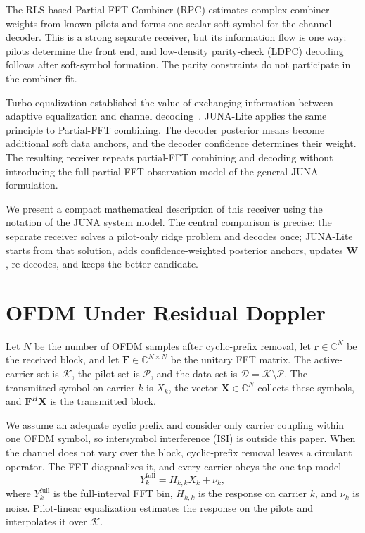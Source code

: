 \documentclass[conference]{IEEEtran}
\newcommand{\C}{\mathbb{C}}
\newcommand{\Pset}{\mathcal{P}}
\newcommand{\Dset}{\mathcal{D}}
\newcommand{\Kset}{\mathcal{K}}
\begin{document}
The RLS-based Partial-FFT Combiner (RPC) estimates complex combiner weights
from known pilots and forms one scalar soft symbol for the channel
decoder.  This is a strong separate receiver, but its information flow is one
way: pilots determine the front end, and low-density parity-check (LDPC)
decoding follows after soft-symbol formation.  The parity constraints do not
participate in the combiner fit.

Turbo equalization established the value of exchanging information between
adaptive equalization and channel decoding~\cite{laot,zheng}.  JUNA-Lite
applies the same principle to Partial-FFT combining.  The decoder posterior
means become additional soft data anchors, and the decoder confidence
determines their weight.  The resulting receiver repeats partial-FFT combining
and decoding without introducing the full partial-FFT observation model of the general
JUNA formulation.

We present a compact mathematical description of this receiver using
the notation of the JUNA system model.  The central comparison is precise:
the separate receiver solves a pilot-only ridge problem and decodes once;
JUNA-Lite starts from that solution, adds confidence-weighted posterior
anchors, updates \(\mathbf W\), re-decodes, and keeps the better candidate.

\section{OFDM Under Residual Doppler}

Let \(N\) be the number of OFDM samples after cyclic-prefix removal, let
\(\mathbf r\in\C^N\) be the received block, and let
\(\mathbf F\in\C^{N\times N}\) be the unitary FFT matrix.  The active-carrier
set is \(\Kset\), the pilot set is \(\Pset\), and the data set is
\(\Dset=\Kset\setminus\Pset\).  The transmitted symbol on carrier \(k\) is
\(X_k\), the vector \(\mathbf X\in\C^N\) collects these symbols, and
\(\mathbf F^H\mathbf X\) is the transmitted block.

We assume an adequate cyclic prefix and consider only carrier coupling within
one OFDM symbol, so intersymbol interference (ISI) is outside this paper.  When
the channel does not vary over the block, cyclic-prefix removal leaves a
circulant operator.  The FFT
diagonalizes it, and every carrier obeys the one-tap model
\begin{equation}
  Y_k^{\mathrm{full}}
  =
  H_{k,k}X_k+\nu_k,
  \label{eq:one-tap}
\end{equation}
where \(Y_k^{\mathrm{full}}\) is the full-interval FFT bin, \(H_{k,k}\) is the
response on carrier \(k\), and \(\nu_k\) is noise.  Pilot-linear equalization
estimates the response on the pilots and interpolates it over \(\Kset\).
\end{document}

